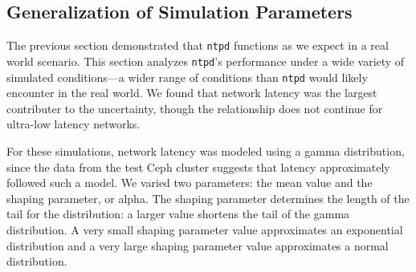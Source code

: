 \subsection{Generalization of Simulation Parameters}

The previous section demonstrated that \texttt{ntpd} functions as we expect in 
a real world scenario.  This section
analyzes \texttt{ntpd}'s performance under a wide variety of simulated
conditions---a wider range of conditions than \texttt{ntpd} would
likely encounter in the real world.  We found that network latency was the 
largest contributer to the uncertainty, though the relationship does not 
continue for ultra-low latency networks.

For these simulations, network latency was modeled using a gamma
distribution,
since the data from the test Ceph cluster suggests that
latency approximately followed such a model. We varied two parameters:
the mean value and the shaping parameter, or alpha. The shaping parameter 
determines the length of the tail for the distribution: a larger value 
shortens the tail of the gamma
distribution.  A very small shaping parameter value approximates an
exponential distribution and a very large shaping parameter value
approximates a normal distribution.


